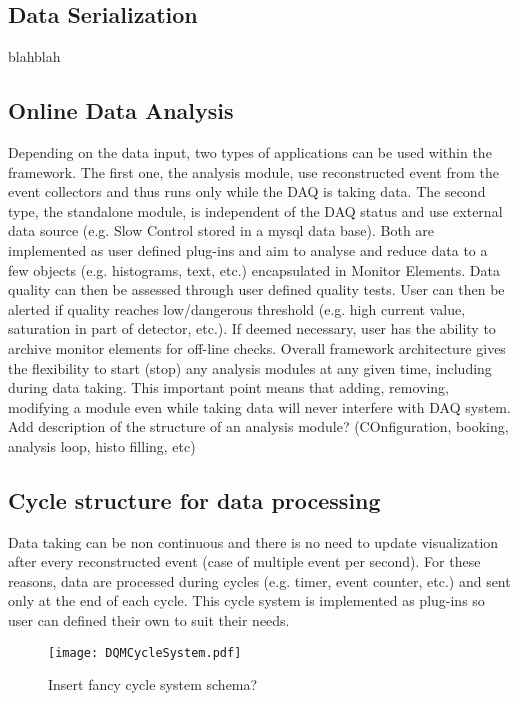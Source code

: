 \documentclass[conference]{IEEEtran}
\begin{document}
\subsection{Data Serialization}

blahblah


\subsection{Online Data Analysis}
Depending on the data input, two types of applications can be used within the framework. The first one, the analysis module, use reconstructed event from the event collectors and thus runs only while the DAQ is taking data. The second type, the standalone module, is independent of the DAQ status and use external data source (e.g. Slow Control stored in a mysql data base).
Both are implemented as user defined plug-ins and aim to analyse and reduce data to a few objects (e.g. histograms, text, etc.) encapsulated in Monitor Elements. Data quality can then be assessed through user defined quality tests. User can then be alerted if quality reaches low/dangerous threshold (e.g. high current value, saturation in part of detector, etc.). If deemed necessary, user has the ability to archive monitor elements for off-line checks.
Overall framework architecture gives the flexibility to start (stop) any analysis modules at any given time, including during data taking. This important point means that adding, removing, modifying a module even while taking data will never interfere with DAQ system.
{\color{red}Add description of the structure of an analysis module? (COnfiguration, booking, analysis loop, histo filling, etc)}

\subsection{Cycle structure for data processing}
Data taking can be non continuous and there is no need to update visualization after every reconstructed event (case of multiple event per second). For these reasons, data are processed during cycles (e.g. timer, event counter, etc.) and sent only at the end of each cycle. This cycle system is implemented as plug-ins so user can defined their own to suit their needs.

\begin{figure}[htbp]
  \begin{center}
    \texttt{[image: DQMCycleSystem.pdf]}
    \caption{\label{fig:DQMCycleSystem} \color{red}Insert fancy cycle system schema?}
  \end{center}
\end{figure}
\end{document}
